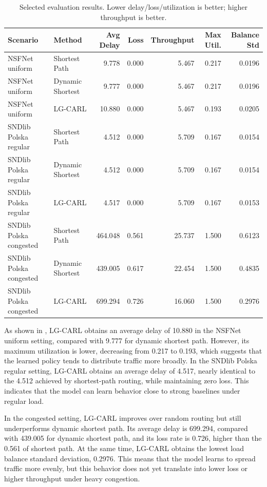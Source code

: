 \documentclass[9pt,a4paper,twocolumn,twoside]{rho-class/rho}
\begin{document}
\begin{table}[t]
    \caption{Selected evaluation results. Lower delay/loss/utilization is better; higher throughput is better.}
    \label{tab:en_results}
    \centering
    \begin{tabular}{llrrrrr}
        \toprule
        \textbf{Scenario} & \textbf{Method} & \textbf{Avg Delay} & \textbf{Loss} & \textbf{Throughput} & \textbf{Max Util.} & \textbf{Balance Std} \\
        \midrule
        NSFNet uniform & Shortest Path & 9.778 & 0.000 & 5.467 & 0.217 & 0.0196 \\
        NSFNet uniform & Dynamic Shortest & 9.777 & 0.000 & 5.467 & 0.217 & 0.0196 \\
        NSFNet uniform & LG-CARL & 10.880 & 0.000 & 5.467 & 0.193 & 0.0205 \\
        SNDlib Polska regular & Shortest Path & 4.512 & 0.000 & 5.709 & 0.167 & 0.0154 \\
        SNDlib Polska regular & Dynamic Shortest & 4.512 & 0.000 & 5.709 & 0.167 & 0.0154 \\
        SNDlib Polska regular & LG-CARL & 4.517 & 0.000 & 5.709 & 0.167 & 0.0153 \\
        SNDlib Polska congested & Shortest Path & 464.048 & 0.561 & 25.737 & 1.500 & 0.6123 \\
        SNDlib Polska congested & Dynamic Shortest & 439.005 & 0.617 & 22.454 & 1.500 & 0.4835 \\
        SNDlib Polska congested & LG-CARL & 699.294 & 0.726 & 16.060 & 1.500 & 0.2976 \\
        \bottomrule
    \end{tabular}
\end{table}

As shown in , LG-CARL obtains an average delay of 10.880 in the NSFNet uniform setting, compared with 9.777 for dynamic shortest path. However, its maximum utilization is lower, decreasing from 0.217 to 0.193, which suggests that the learned policy tends to distribute traffic more broadly. In the SNDlib Polska regular setting, LG-CARL obtains an average delay of 4.517, nearly identical to the 4.512 achieved by shortest-path routing, while maintaining zero loss. This indicates that the model can learn behavior close to strong baselines under regular load.

In the congested setting, LG-CARL improves over random routing but still underperforms dynamic shortest path. Its average delay is 699.294, compared with 439.005 for dynamic shortest path, and its loss rate is 0.726, higher than the 0.561 of shortest path. At the same time, LG-CARL obtains the lowest load balance standard deviation, 0.2976. This means that the model learns to spread traffic more evenly, but this behavior does not yet translate into lower loss or higher throughput under heavy congestion.
\end{document}
